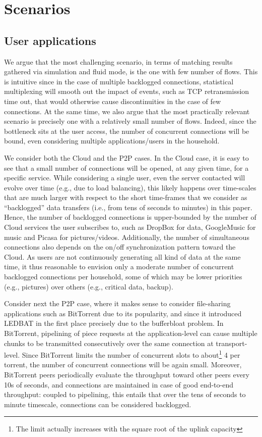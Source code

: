 \documentclass[conference]{IEEEtran}
\newcommand{\secL}[1]{\label{sec:#1}}
\begin{document}
\section{Scenarios}\secL{scenario}

\subsection{User applications}
We argue that the most challenging scenario, in terms of matching results gathered via simulation and fluid mode, is the one with few number of flows. This is intuitive since in the case of multiple backlogged connections, statistical multiplexing will smooth out the impact of events, such as TCP retransmission time out, that would otherwise cause discontinuities in the case of few connections. At the same time, we also argue that the most practically relevant scenario is precisely one with a relatively small number of flows. Indeed, since the bottleneck sits at the user access, the number of concurrent connections will be bound, even considering multiple applications/users in the household.

We consider both the Cloud and the P2P cases. In the Cloud case, it is easy to see that a small number of connections will be opened, at any given time, for a specific service. While considering a single user, even the server contacted will evolve over time (e.g., due to load balancing), this likely happens over time-scales that are much larger with respect to the short time-frames that we consider as ``backlogged'' data transfers (i.e., from tens of seconds to minutes) in this paper. Hence, the number of backlogged connections is upper-bounded by the number of Cloud services the user subscribes to, such as DropBox for  data, GoogleMusic for music and Picasa for pictures/videos. Additionally, the number of simultaneous connections also depends on the on/off synchronization pattern toward the Cloud. As users are not continuously generating all kind of data at the same time, it thus reasonable to envision only a moderate number of concurrent backlogged connections per household, some of which may be lower priorities (e.g., pictures) over others (e.g., critical data, backup).

Consider next the P2P case, where it makes sense to consider file-sharing applications such as BitTorrent due to its popularity, and since it introduced LEDBAT in the first place precisely due to the bufferbloat problem.
In BitTorrent, pipelining of piece requests at the application-level can cause multiple chunks to be transmitted consecutively over the same connection at transport-level. Since BitTorrent limits the number of concurrent slots to about\footnote{The limit actually increases with the square root of the uplink capacity} 4 per torrent, the number of concurrent connections will be again small. Moreover, BitTorrent peers periodically evaluate the throughput toward other peers every 10s of seconds, and connections are maintained in case of good end-to-end throughput: coupled to pipelining, this entails that over the tens of seconds to minute timescale, connections can be considered backlogged.
\end{document}
